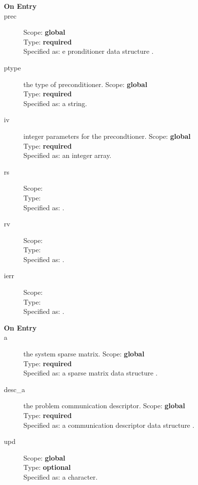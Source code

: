 \begin{description}
\item[\bf On Entry]
\item[prec] 
Scope: {\bf global} \\
Type: {\bf required}\\
Specified as: e pronditioner data structure \precdata.
\item[ptype] the type of preconditioner. 
Scope: {\bf global} \\
Type: {\bf required}\\
Specified as: a string.
\item[iv] integer parameters for the precondtioner. 
Scope: {\bf global} \\
Type: {\bf required}\\
Specified as: an integer array.
\item[rs] 
Scope: {\bf } \\
Type: {\bf }\\
Specified as: .
\item[rv] 
Scope: {\bf } \\
Type: {\bf }\\
Specified as: .
\item[ierr] 
Scope: {\bf } \\
Type: {\bf }\\
Specified as: .
\end{description}






\begin{description}
\item[\bf On Entry]
\item[a] the system sparse matrix.
Scope: {\bf global} \\
Type: {\bf required}\\
Specified as: a sparse matrix data structure \spdata.
\item[desc\_a] the problem communication descriptor. 
Scope: {\bf global} \\
Type: {\bf required}\\
Specified as: a communication descriptor data structure \descdata.
\item[upd] 
Scope: {\bf global} \\
Type: {\bf optional}\\
Specified as: a character.
\end{description}

